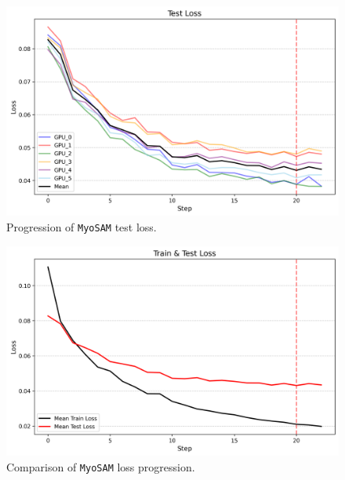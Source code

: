 \begin{figure}[H]
	\centering
	\includegraphics[width=\textwidth]{"images/test_loss.png"}
	\caption[Test loss \texttt{MyoSAM}]{Progression of \texttt{MyoSAM} test loss.}
	\label{figtestloss}
\end{figure}
\begin{figure}
	\centering
	\includegraphics[width=\textwidth]{"images/train_test_loss.png"}
	\caption[Train and Test loss \texttt{MyoSAM}]{Comparison of \texttt{MyoSAM} loss progression.}
	\label{figtraintestloss}
\end{figure}
